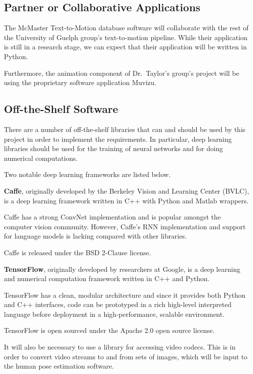 \documentclass{scrreprt}
\begin{document}
\subsection{Partner or Collaborative Applications}

The McMaster Text-to-Motion database software will collaborate with the rest of
the University of Guelph group's text-to-motion pipeline. While their
application is still in a research stage, we can expect that their application
will be written in Python.

Furthermore, the animation component of Dr.\ Taylor's group's project will be
using the proprietary software application Muvizu.

\subsection{Off-the-Shelf Software}

There are a number of off-the-shelf libraries that can and should be used by
this project in order to implement the requirements. In particular, deep
learning libraries should be used for the training of neural networks and for
doing numerical computations.

Two notable deep learning frameworks are listed below.

\textbf{Caffe}, originally developed by the Berkeley Vision and Learning Center
(BVLC),  is a deep learning framework written in C++ with Python and Matlab
wrappers.

Caffe has a strong ConvNet implementation and is popular amongst the
computer vision community. However, Caffe's RNN implementation and support for
language models is lacking compared with other libraries.

Caffe is released under the BSD 2-Clause license.

\textbf{TensorFlow}, originally developed by researchers at Google, is a deep
learning and numerical computation framework written in C++ and Python.

TensorFlow has a clean, modular architecture and since it provides both Python
and C++ interfaces, code can be prototyped in a rich high-level interpreted
language before deployment in a high-performance, scalable environment.

TensorFlow is open sourced under the Apache 2.0 open source license.

It will also be necessary to use a library for accessing video codecs. This is
in order to convert video streams to and from sets of images, which will be
input to the human pose estimation software.
\end{document}
